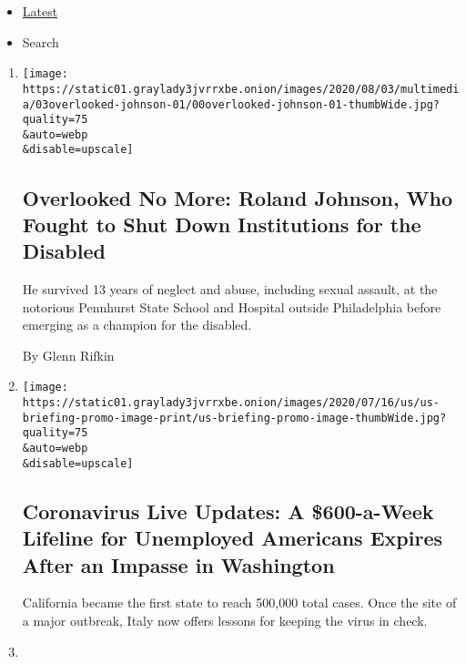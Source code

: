 \begin{itemize}
\tightlist
\item
  \protect\hyperlink{stream-panel}{Latest}
\item
  Search
\end{itemize}

\begin{enumerate}
\def\labelenumi{\arabic{enumi}.}
\item
  \href{/2020/07/31/obituaries/roland-johnson-overlooked.html}{}

  \texttt{[image: https://static01.graylady3jvrrxbe.onion/images/2020/08/03/multimedia/03overlooked-johnson-01/00overlooked-johnson-01-thumbWide.jpg?quality=75\\\&auto=webp\\\&disable=upscale]}

  \hypertarget{overlooked-no-more-roland-johnson-who-fought-to-shut-down-institutions-for-the-disabled}{%
  \subsection{Overlooked No More: Roland Johnson, Who Fought to Shut
  Down Institutions for the
  Disabled}\label{overlooked-no-more-roland-johnson-who-fought-to-shut-down-institutions-for-the-disabled}}

  He survived 13 years of neglect and abuse, including sexual assault,
  at the notorious Pennhurst State School and Hospital outside
  Philadelphia before emerging as a champion for the disabled.

  By Glenn Rifkin
\item
  \href{/2020/07/31/world/coronavirus-covid-19.html}{}

  \texttt{[image: https://static01.graylady3jvrrxbe.onion/images/2020/07/16/us/us-briefing-promo-image-print/us-briefing-promo-image-thumbWide.jpg?quality=75\\\&auto=webp\\\&disable=upscale]}

  \hypertarget{coronavirus-live-updates-a-600-a-week-lifeline-for-unemployed-americans-expires-after-an-impasse-in-washington}{%
  \subsection{Coronavirus Live Updates: A \$600-a-Week Lifeline for
  Unemployed Americans Expires After an Impasse in
  Washington}\label{coronavirus-live-updates-a-600-a-week-lifeline-for-unemployed-americans-expires-after-an-impasse-in-washington}}

  California became the first state to reach 500,000 total cases. Once
  the site of a major outbreak, Italy now offers lessons for keeping the
  virus in check.
\item
  \href{/2020/07/31/world/asia/indonesia-coronavirus.html}{}


\end{enumerate}
